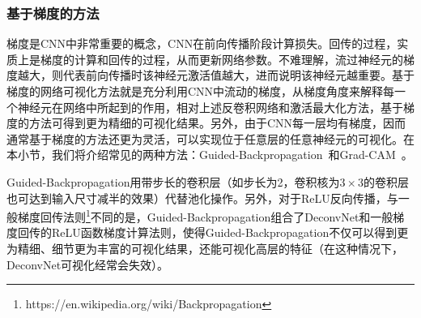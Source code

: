 \subsubsection{基于梯度的方法}\label{subsec:gradient_based_methods}
梯度是CNN中非常重要的概念，CNN在前向传播阶段计算损失。回传的过程，实质上是梯度的计算和回传的过程，从而更新网络参数。不难理解，流过神经元的梯度越大，则代表前向传播时该神经元激活值越大，进而说明该神经元越重要。基于梯度的网络可视化方法就是充分利用CNN中流动的梯度，从梯度角度来解释每一个神经元在网络中所起到的作用，相对上述反卷积网络和激活最大化方法，基于梯度的方法可得到更为精细的可视化结果。另外，由于CNN每一层均有梯度，因而通常基于梯度的方法还更为灵活，可以实现位于任意层的任意神经元的可视化。在本小节，我们将介绍常见的两种方法：Guided-Backpropagation~\cite{springenberg2014striving}和Grad-CAM~\cite{selvaraju2017grad}。

Guided-Backpropagation用带步长的卷积层（如步长为2，卷积核为$3\times 3$的卷积层也可达到输入尺寸减半的效果）代替池化操作。另外，对于ReLU反向传播，与一般梯度回传法则\footnote{https://en.wikipedia.org/wiki/Backpropagation}不同的是，Guided-Backpropagation组合了DeconvNet和一般梯度回传的ReLU函数梯度计算法则，使得Guided-Backpropagation不仅可以得到更为精细、细节更为丰富的可视化结果，还能可视化高层的特征（在这种情况下，DeconvNet可视化经常会失效）。

